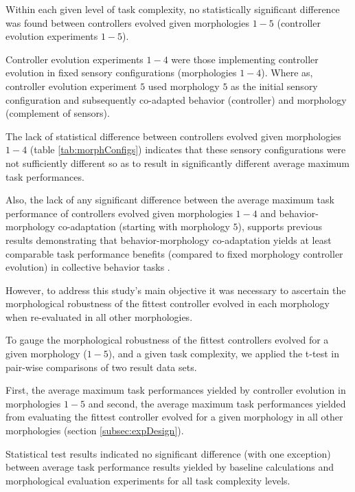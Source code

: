 Within each given level of task complexity, no statistically significant difference was found between
controllers evolved given morphologies $1-5$ (controller evolution experiments $1-5$).

Controller evolution experiments $1-4$ were those implementing controller evolution in fixed sensory
configurations (morphologies $1-4$).  Where as, controller evolution experiment $5$ used morphology $5$
as the initial sensory configuration and subsequently co-adapted behavior (controller) and morphology
(complement of sensors).

The lack of statistical difference between controllers evolved given morphologies $1-4$ (table \ref{tab:morphConfigs})
indicates that these sensory configurations were not sufficiently different so as to result in
significantly different average maximum task performances.

Also, the lack of any significant difference between the average maximum task performance of controllers
evolved given morphologies $1-4$ and behavior-morphology co-adaptation (starting with morphology $5$),
supports previous results demonstrating that behavior-morphology co-adaptation
yields at least comparable task performance benefits (compared to fixed morphology controller evolution)
in collective behavior tasks \cite{HewlandNitschke2015}.

However, to address this study's main objective it was necessary to ascertain the morphological robustness
of the fittest controller evolved in each morphology when re-evaluated in all other morphologies.

To gauge the morphological robustness of the fittest controllers evolved for a given morphology ($1-5$),
and a given task complexity, we applied the t-test in pair-wise comparisons of two result
data sets.  

First, the average maximum task performances yielded by controller evolution in morphologies
$1-5$ and second, the average maximum task performances yielded from evaluating the fittest controller
evolved for a given morphology in all other morphologies (section \ref{subsec:expDesign}).

Statistical test results indicated no significant difference (with one exception) between average task performance results
yielded by baseline calculations and morphological evaluation experiments for all task complexity levels.

